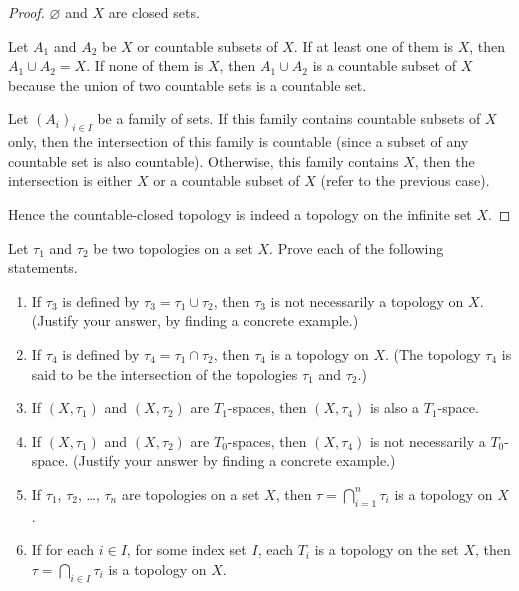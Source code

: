 \begin{proof}
    $\varnothing$ and $X$ are closed sets.

    Let $A_{1}$ and $A_{2}$ be $X$ or countable subsets of $X$. If at least one of them is $X$, then $A_{1}\cup A_{2} = X$. If none of them is $X$, then $A_{1}\cup A_{2}$ is a countable subset of $X$ because the union of two countable sets is a countable set.

    Let ${(A_{i})}_{i\in I}$ be a family of sets. If this family contains countable subsets of $X$ only, then the intersection of this family is countable (since a subset of any countable set is also countable). Otherwise, this family contains $X$, then the intersection is either $X$ or a countable subset of $X$ (refer to the previous case).

    Hence the countable-closed topology is indeed a topology on the infinite set $X$.
\end{proof}
\newpage

\begin{exercise}
    Let $\tau_{1}$ and $\tau_{2}$ be two topologies on a set $X$. Prove each of the following statements.
    \begin{enumerate}[label={(\roman*)}]
        \item If $\tau_{3}$ is defined by $\tau_{3} = \tau_{1}\cup \tau_{2}$, then $\tau_{3}$ is not necessarily a topology on $X$. (Justify your answer, by finding a concrete example.)
        \item If $\tau_{4}$ is defined by $\tau_{4} = \tau_{1}\cap \tau_{2}$, then $\tau_{4}$ is a topology on $X$. (The topology $\tau_{4}$ is said to be the {\color{red}intersection} of the topologies $\tau_{1}$ and $\tau_{2}$.)
        \item If $(X, \tau_{1})$ and $(X, \tau_{2})$ are $T_{1}$-spaces, then $(X, \tau_{4})$ is also a $T_{1}$-space.
        \item If $(X, \tau_{1})$ and $(X, \tau_{2})$ are $T_{0}$-spaces, then $(X, \tau_{4})$ is not necessarily a $T_{0}$-space. (Justify your answer by finding a concrete example.)
        \item If $\tau_{1}$, $\tau_{2}$, \ldots, $\tau_{n}$ are topologies on a set $X$, then $\tau = \bigcap^{n}_{i=1} \tau_{i}$ is a topology on $X$.
        \item If for each $i\in I$, for some index set $I$, each $T_{i}$ is a topology on the set $X$, then $\tau = \bigcap_{i\in I} \tau_{i}$ is a topology on $X$.
    \end{enumerate}
\end{exercise}


